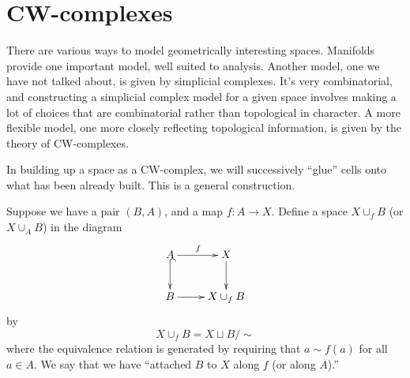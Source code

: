 \section{CW-complexes}

There are various ways to model geometrically interesting spaces. 
Manifolds provide one important model, well suited to analysis.  
Another model, one we have not talked 
about, is given by simplicial complexes. It's very combinatorial,
and constructing a simplicial complex model for a given space involves
making a lot of choices that are combinatorial rather than topological
in character. A more flexible model, one more closely reflecting topological
information, is given by the theory of CW-complexes. 

In building up a space as a CW-complex, we will successively ``glue'' cells
onto what has been already built. This is a general construction. 

Suppose we have a pair $(B,A)$, and a map $f:A\to X$. Define a space
$X\cup_f B$ (or $X\cup_A B$) in the diagram
\begin{equation*}
\xymatrix{A\ar[r]^f\ar@{^(->}[d] & X\ar[d]\\
B\ar[r] & X\cup_f B}
\end{equation*}
by
\[
X\cup_f B=X\sqcup B/\sim
\]
where the equivalence relation is generated by requiring that $a\sim f(a)$ 
for all $a\in A$. We say that we have ``attached $B$ to $X$ along $f$ (or 
along $A$).'' 


